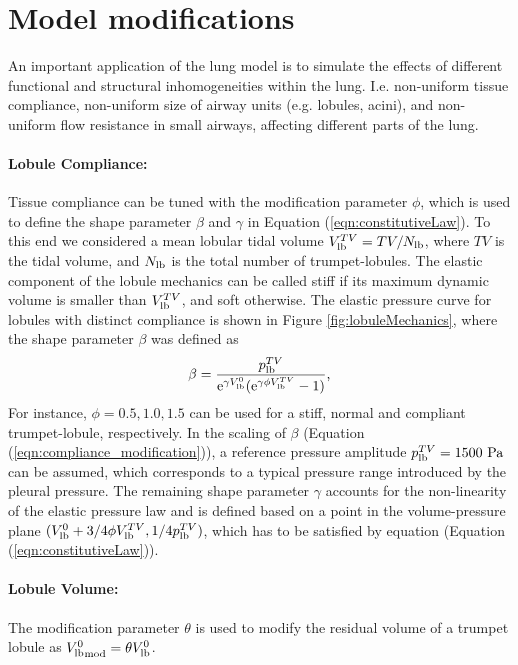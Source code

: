 \section{Model modifications} \label{sec:model_modifications}
An important application of the lung model is to simulate the effects of different functional and structural inhomogeneities within the lung.
I.e. non-uniform tissue compliance, non-uniform size of airway units (e.g. lobules, acini), and non-uniform flow resistance in small airways, affecting different parts of the lung.

\paragraph{Lobule Compliance: }
Tissue compliance can be tuned with the modification parameter $\phi$, which is used to define the shape parameter $\beta$ and $\gamma$ in Equation (\ref{eqn:constitutiveLaw}).
To this end we considered a mean lobular tidal volume $V_{\mathrm{lb}}^{TV} = TV/N_{\mathrm{lb}}$, where $TV$ is the tidal volume, and $N_{\mathrm{lb}}$ is the total number of trumpet-lobules.
The elastic component of the lobule mechanics can be called stiff if its maximum dynamic volume is smaller than $V_{\mathrm{lb}}^{TV}$, and soft otherwise.
The elastic pressure curve for lobules with distinct compliance is shown in Figure \ref{fig:lobuleMechanics}, where the shape parameter $\beta$ was defined as
\begin{equation} \label{eqn:compliance_modification}
\beta = \frac{p_\mathrm{lb}^{TV}}{\mathrm{e}^{\gamma V_\mathrm{lb}^0}(\mathrm{e}^{\gamma \phi V_\mathrm{lb}^{TV}} - 1)} \text{,}
\end{equation}
For instance, $\phi = 0.5, 1.0, 1.5$ can be used for a stiff, normal and compliant trumpet-lobule, respectively.
In the scaling of $\beta$ (Equation (\ref{eqn:compliance_modification})), a reference pressure amplitude $p_{\mathrm{lb}}^{TV} = 1500 ~\mathrm{Pa}$ can be assumed, which corresponds to a typical pressure range introduced by the pleural pressure.
The remaining shape parameter $\gamma$ accounts for the non-linearity of the elastic pressure law and is defined based on a point in the volume-pressure plane $(V_{\mathrm{lb}}^0 + 3/4\phi V_{\mathrm{lb}}^{TV}, 1/4 p_{\mathrm{lb}}^{TV})$, which has to be satisfied by equation (Equation (\ref{eqn:constitutiveLaw})).

\paragraph{Lobule Volume: }
The modification parameter $\theta$ is used to modify the residual volume of a trumpet lobule as ${V_{\mathrm{lb}}^0}_\mathrm{mod} = \theta V_{\mathrm{lb}}^{0}$.

